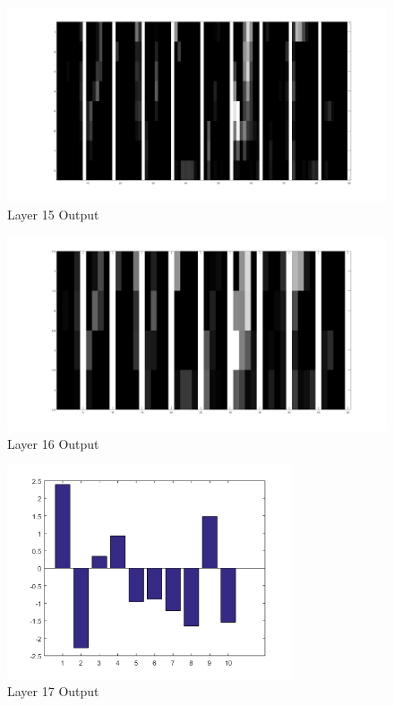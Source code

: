 \documentclass[11pt,english]{article}
\begin{document}
\begin{appendices}
\begin{figure}[h!]
  \caption{Layer 15 Output}
  \centering
    \includegraphics[width=\textwidth]{layer/15}
\end{figure}

\begin{figure}[h!]
  \caption{Layer 16 Output}
  \centering
    \includegraphics[width=\textwidth]{layer/16}
\end{figure}

\begin{figure}[h!]
  \caption{Layer 17 Output}
  \centering
    \includegraphics[width=0.75\textwidth]{layer/17}
\end{figure}


\end{appendices}
\end{document}
